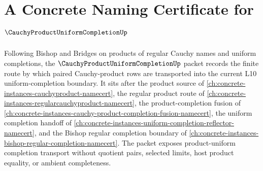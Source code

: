 \chapter{A Concrete Naming Certificate for $\CauchyProductUniformCompletionUp$}
\label{ch:concrete-instances-cauchy-product-uniform-completion-namecert}

Following Bishop and Bridges on products of regular Cauchy names and uniform completions, the $\CauchyProductUniformCompletionUp$ packet records the finite route by which paired Cauchy-product rows are transported into the current L10 uniform-completion boundary. It sits after the product source of \autoref{ch:concrete-instances-cauchyproduct-namecert}, the regular product route of \autoref{ch:concrete-instances-regularcauchyproduct-namecert}, the product-completion fusion of \autoref{ch:concrete-instances-cauchy-product-completion-fusion-namecert}, the uniform completion handoff of \autoref{ch:concrete-instances-uniform-completion-reflector-namecert}, and the Bishop regular completion boundary of \autoref{ch:concrete-instances-bishop-regular-completion-namecert}. The packet exposes product-uniform completion transport without quotient pairs, selected limits, host product equality, or ambient completeness.


